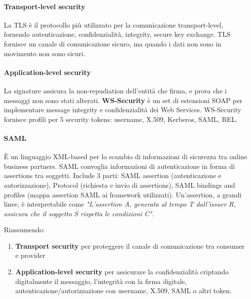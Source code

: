 \documentclass[11pt]{article}
\begin{document}
\paragraph{Transport-level security} La TLS è il protocollo più utilizzato per la comunicazione transport-level, fornendo autenticazione, confidenzialità, integrity, secure key exchange. TLS fornisce un canale di comunicazione sicuro, ma quando i dati non sono in movimento non sono sicuri. 
\paragraph{Application-level security} La signature assicura la non-repudiation dell'entità che firma, e prova che i messaggi non sono stati alterati. \textbf{WS-Security} è un set di estensioni SOAP per implementare message integrity e confidenzialità dei Web Services. WS-Security fornisce profili per 5 security tokens: username, X.509, Kerberos, SAML, REL.
\paragraph{SAML} È un linguaggio XML-based per lo scambio di informazioni di sicurezza tra online business partners. SAML convoglia informazioni di autenticazione in forma di assertions tra soggetti. Include 3 parti: SAML assertion (autenticazione e autorizzazione), Protocol (richiesta e invio di assertions), SAML bindings and profiles (mappa assertion SAML ai framework utilizzati).
Un'assertion, a grandi linee, è interpretabile come \textit{"L'assertion A, generata al tempo T dall'issuer R, assicura che il soggetto S rispetta le condizioni C".} 

Riassumendo:
\begin{enumerate}
    \item \textbf{Transport security} per proteggere il canale di comunicazione tra consumer e provider 
    \item \textbf{Application-level security} per assicurare la confidenzialità criptando digitalmente il messaggio, l'integrità con la firma digitale, autenticazione/autorizzazione con username, X.509, SAML o altri token.
\end{enumerate}
\end{document}
